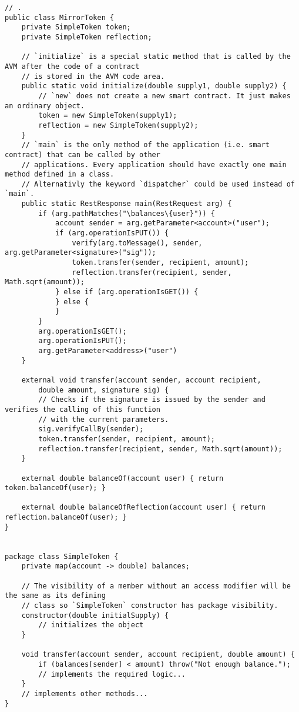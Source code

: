 \begin{lstlisting}[frame=TB, float, title=Argon contracts are static classes,label={lst:code1}]
// .
public class MirrorToken {
    private SimpleToken token;
    private SimpleToken reflection;

    // `initialize` is a special static method that is called by the AVM after the code of a contract
    // is stored in the AVM code area.
    public static void initialize(double supply1, double supply2) {
        // `new` does not create a new smart contract. It just makes an ordinary object.
        token = new SimpleToken(supply1);
        reflection = new SimpleToken(supply2);
    }
    // `main` is the only method of the application (i.e. smart contract) that can be called by other
    // applications. Every application should have exactly one main method defined in a class.
    // Alternativly the keyword `dispatcher` could be used instead of `main`.
    public static RestResponse main(RestRequest arg) {
        if (arg.pathMatches("\balances\{user}")) {
            account sender = arg.getParameter<account>("user");
            if (arg.operationIsPUT()) {
                verify(arg.toMessage(), sender, arg.getParameter<signature>("sig"));
                token.transfer(sender, recipient, amount);
                reflection.transfer(recipient, sender, Math.sqrt(amount));
            } else if (arg.operationIsGET()) {
            } else {
            }
        }
        arg.operationIsGET();
        arg.operationIsPUT();
        arg.getParameter<address>("user")
    }

    external void transfer(account sender, account recipient,
        double amount, signature sig) {
        // Checks if the signature is issued by the sender and verifies the calling of this function
        // with the current parameters.
        sig.verifyCallBy(sender);
        token.transfer(sender, recipient, amount);
        reflection.transfer(recipient, sender, Math.sqrt(amount));
    }

    external double balanceOf(account user) { return token.balanceOf(user); }

    external double balanceOfReflection(account user) { return reflection.balanceOf(user); }
}


package class SimpleToken {
    private map(account -> double) balances;

    // The visibility of a member without an access modifier will be the same as its defining
    // class so `SimpleToken` constructor has package visibility.
    constructor(double initialSupply) {
        // initializes the object
    }

    void transfer(account sender, account recipient, double amount) {
        if (balances[sender] < amount) throw("Not enough balance.");
        // implements the required logic...
    }
    // implements other methods...
}
\end{lstlisting}

